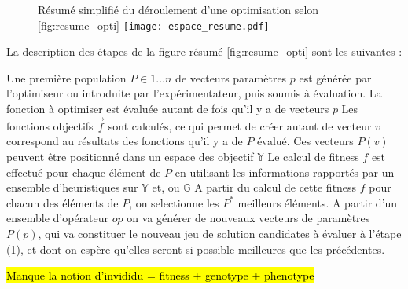 

\begin{figure}[!ht]
	\begin{sidecaption}[fortoc]{Résumé simplifié du déroulement d'une optimisation selon \textcite[109]{Weise2011}}[fig:resume_opti]
		\centering
		\texttt{[image: espace\_resume.pdf]}{
		}
  \end{sidecaption}
\end{figure}

La description des étapes de la figure résumé \ref{fig:resume_opti} sont les suivantes :

\begin{itemize}[label=\textbullet]
	 Une première population $P \in {1 \dotsc n}$ de vecteurs paramètres ${p}$ est générée par l'optimiseur ou introduite par l'expérimentateur, puis soumis à évaluation.
	 La fonction à optimiser est évaluée autant de fois qu'il y a de vecteurs ${p}$
	 Les fonctions objectifs $\vec{f}$ sont calculés, ce qui permet de créer autant de vecteur ${v}$ correspond au résultats des fonctions qu'il y a de $P$ évalué. Ces vecteurs $P(v)$ peuvent être positionné dans un espace des objectif $\mathbb{Y}$
	 Le calcul de fitness $f$ est effectué pour chaque élément de $P$ en utilisant les informations rapportés par un ensemble d'heuristiques sur $\mathbb{Y}$ et, ou $\mathbb{G}$
	 A partir du calcul de cette fitness $f$ pour chacun des éléments de $P$, on selectionne les $P^*$ meilleurs éléments.
	 A partir d'un ensemble d'opérateur ${op}$ on va générer de nouveaux vecteurs de paramètres $P(p)$, qui va constituer le nouveau jeu de solution candidates à évaluer à l'étape (1), et dont on espère qu'elles seront si possible meilleures que les précédentes.
\end{itemize}

\hl{Manque la notion d'invididu = fitness + genotype + phenotype}





